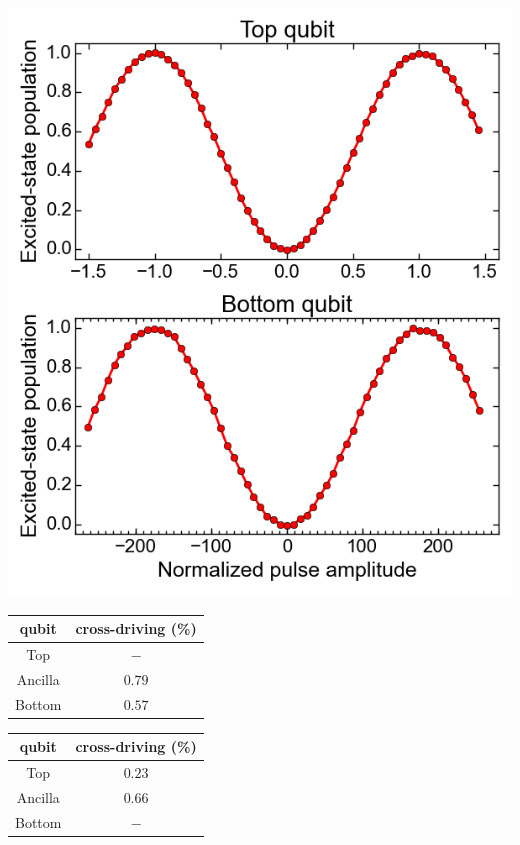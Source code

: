       {\centering
        \begin{minipage}{0.65\textwidth}
          \centering
          \includegraphics[width=\textwidth]{../Figures/Exploring frequency re-use/cross-driving_Rabi.png}
          \label{fig:cross-driving Rabi}
        \end{minipage}
        \begin{minipage}{0.35\textwidth}
          \centering
          \begin{tabular}{c | c}
            qubit & cross-driving (\%) \\
            \hline
            Top & $-$ \\
            Ancilla &$ 0.79$ \\
            Bottom & $0.57$
          \label{tab:cross-driving top}
          \end{tabular}
          \vspace{2cm}
          \begin{tabular}{c | c}
            qubit & cross-driving (\%) \\
            \hline
            Top & $0.23$ \\
            Ancilla &$ 0.66$ \\
            Bottom & $-$
          \end{tabular}
          \label{tab:cross-driving bottom}
        \end{minipage}
      \vspace{1cm}
      }

